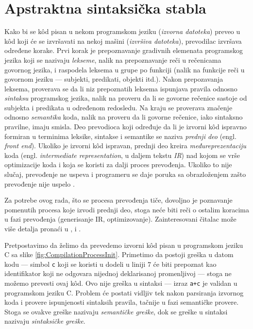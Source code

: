 \section{Apstraktna sintaksička stabla}
\label{sec:AST}

Kako bi se k\^od pisan u nekom programskom jeziku (\emph{izvorna datoteka}) preveo u k\^od koji će se izvršavati na nekoj mašini (\emph{izvršiva datoteka}), prevodilac izvršava određene korake. Prvi korak je prepoznavanje gradivnih elemenata programskog jezika koji se nazivaju \emph{lekseme}, nalik na prepoznavanje reči u rečenicama govornog jezika, i raspodela leksema u grupe po funkciji (nalik na funkcije reči u govornom jeziku --- subjekti, predikati, objekti itd.). Nakon prepozavanja leksema, proverava se da li niz prepoznatih leksema ispunjava pravila odnosno \emph{sintaksu} programskog jezika, nalik na proveru da li se govorne rečenice sastoje od subjekta i predikata u određenom redosledu. Na kraju se proverava značenje odnosno \emph{semantika} koda, nalik na proveru da li govorne rečenice, iako sintaksno pravilne, imaju smisla. Deo prevodioca koji određuje da li je izvorni k\^od ispravno formiran u terminima leksike, sintakse i semantike se naziva \emph{prednji deo} (engl. \emph{front end}). Ukoliko je izvorni k\^od ispravan, prednji deo kreira \emph{međureprezentaciju} koda (engl. \emph{intermediate representation}, u daljem tekstu \emph{IR}) nad kojom se vrše optimizacije koda i koja se koristi za dalji proces prevođenja. Ukoliko to nije slučaj, prevođenje ne uspeva i programeru se daje poruka sa obrazloženjem zašto prevođenje nije uspelo \cite{EngineeringCompilers}.

Za potrebe ovog rada, što se procesa prevođenja tiče, dovoljno je poznavanje pomenutih procesa koje izvodi prednji deo, stoga neće biti reči o ostalim koracima u fazi prevođenja (generisanje IR, optimizovanje). Zainteresovani čitalac može više detalja pronaći u \cite{DragonBook}, \cite{EngineeringCompilers} i \cite{CompilerConstruction}. 

Pretpostavimo da želimo da prevedemo izvorni k\^od pisan u programskom jeziku C sa slike \ref{fig:CompilationProcessInit}. Primetimo da postoji greška u datom kodu --- simbol \texttt{c} koji se koristi u dodeli u liniji $7$ će biti prepoznat kao identifikator koji ne odgovara nijednoj deklarisanoj promenljivoj --- stoga ne možemo prevesti ovaj k\^od. Ovo nije greška u sintaksi --- izraz \texttt{a+c} je validan u programskom jeziku C. Problem će postati vidljiv tek nakon parsiranja izvornog koda i provere ispunjenosti sintaksih pravila, tačnije u fazi semantičke provere. Stoga se ovakve greške nazivaju \emph{semantičke greške}, dok se greške u sintaksi nazivaju \emph{sintaksičke greške}.

